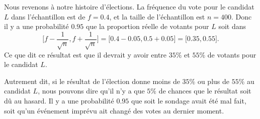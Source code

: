 Nous revenons à notre histoire d'élections. La fréquence du vote pour le candidat \( L\) dans l'échantillon est de \( f=0.4\), et la taille de l'échantillon est \( n=400\). Donc il y a une probabilité \( 0.95\) que la proportion réelle de votants pour \( L\) soit dans
\begin{equation}
    \mathopen[ f-\frac{1}{ \sqrt{n} } , f+\frac{1}{ \sqrt{n} } \mathclose]=\mathopen[ 0.4-0.05 , 0.5+0.05 \mathclose]=\mathopen[ 0.35 , 0.55 \mathclose].
\end{equation}
Ce que dit ce résultat est que il devrait y avoir entre \( 35\%\) et \( 55\%\) de votants pour le candidat \( L\).

Autrement dit, si le résultat de l'élection donne moins de \( 35\%\) ou plus de \( 55\%\) au candidat \( L\), nous pouvons dire qu'il n'y a que \( 5\%\) de chances que le résultat soit dû au hasard. Il y a une probabilité \( 0.95\) que soit le sondage avait été mal fait, soit qu'un événement imprévu ait changé des votes au dernier moment.



